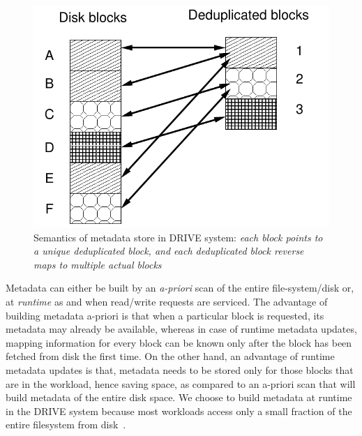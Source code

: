 \begin{figure}
    \centering
    \includegraphics[scale=0.6]{confided-figures/main/deduped-block.pdf}
    \caption{Semantics of metadata store in DRIVE system: \textit{each block points to a unique deduplicated block, and each deduplicated block reverse maps to multiple actual blocks}}
    \label{fig:deduped-block}
\end{figure}

Metadata can either be built by an \textit{a-priori} scan of the entire
file-system/disk or, at \textit{runtime} as and when read/write
requests are serviced. The advantage of building metadata a-priori is that
when a particular block is requested, its metadata may already be
available,
whereas in case of runtime metadata updates, mapping information for
every block can be known only after the block has been fetched from disk
the first time.
On the other hand, an advantage of runtime metadata updates is that,
metadata needs to be stored only for those blocks that are in the workload,
hence saving space, as compared to an a-priori scan that will build metadata
of the entire disk space. We choose to build metadata at runtime in the
DRIVE system because most workloads access only a small fraction of the 
entire filesystem from disk~\cite{iodedup}.

